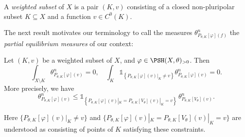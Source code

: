 \begin{definition}\label{def:weightedss}
A \emph{weighted subset} of $X$ is a pair $(K,v)$ consisting of a closed non-pluripolar subset $K\subseteq X$ and a function $v\in C^0(K)$.
\end{definition}
The next result motivates our terminology to call the measures $\theta_{P_{\theta,K}[\varphi](f)}^n$ the \emph{partial equilibrium measures} of our context:
\begin{lemma}\label{lma:balayage}
Let $(K,v)$ be a weighted subset of $X$, and $\varphi\in \PSH(X,\theta)_{>0}$.
Then
\begin{equation}\label{eq:intXminusKthetan_vanish}
\int_{X\setminus K}\theta_{P_{\theta,K}[\varphi](v)}^n=0,\quad \int_K \mathds{1}_{\left\{P_{\theta,K}[\varphi](v)|_K\neq v\right\}}\theta_{P_{\theta,K}[\varphi](v)}^n=0.
\end{equation}
More precisely, we have
\begin{equation}\label{eq:thetaPKuv}
\theta_{P_{\theta,K}[\varphi](v)}^n\leq \mathds{1}_{\left\{P_{\theta,K}[\varphi](v)|_K=P_{\theta,K}[V_{\theta}](v)|_K=v\right\}}\,\theta_{P_{\theta,K}[V_{\theta}](v)}^n.
\end{equation}
\end{lemma}
Here $\{P_{\theta,K}[\varphi](v)|_K\neq v\}$ and $\{P_{\theta,K}[\varphi](v)|_K=P_{\theta,K}[V_{\theta}](v)|_K=v\}$ are understood as consisting of points of $K$ satisfying these constraints.


